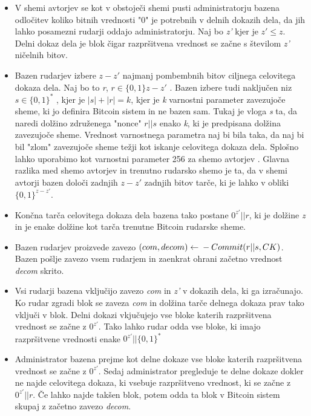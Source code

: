 \documentclass{acm_proc_article-sp}
\begin{document}
\begin{itemize}
	\item V shemi avtorjev se kot v obstoječi shemi pusti administratorju bazena odločitev koliko bitnih vrednosti "0" je potrebnih v delnih dokazih dela, da jih lahko posamezni rudarji oddajo administratorju. Naj bo \textit{z'} kjer je \textit{$z' \le z$}. Delni dokaz dela je blok čigar razpršitvena vrednost se začne s številom \textit{z'} ničelnih bitov.
	\item Bazen rudarjev izbere \textit{$z - z'$} najmanj pombembnih bitov ciljnega celovitega dokaza dela. Naj bo to \textit{r}, $r \in \{0, 1\} z - z'$ . Bazen izbere tudi naključen niz $s \in \{0, 1\}^*$ , kjer je \textit{$ |s| + |r| = k$}, kjer je \textit{k} varnostni parameter zavezujoče sheme, ki jo definira Bitcoin sistem in ne bazen sam. Tukaj je vloga \textit{s} ta, da naredi dolžino združenega "nonce" \textit{$r||s$} enako \textit{k}, ki je predpisana dolžina zavezujoče sheme. Vrednost varnostnega parametra naj bi bila taka, da naj bi bil "zlom" zavezujoče sheme težji kot iskanje celovitega dokaza dela. Splošno lahko uporabimo kot varnostni parameter 256 za shemo avtorjev \cite{originalarticle}. Glavna razlika med shemo avtorjev in trenutno rudarsko shemo je ta, da v shemi avtorji bazen določi zadnjih \textit{$ z - z' $} zadnjih bitov tarče, ki je lahko v obliki $\{0, 1\}^{z-z'}$.
	\item Končna tarča celovitega dokaza dela bazena tako postane \textit{$0^{z'}||r$}, ki je dolžine \textit{z} in je enake dolžine kot tarča trenutne Bitcoin rudarske sheme.
	\item Bazen rudarjev proizvede zavezo \textit{$(com, decom) \leftarrow \\ - Commit(r||s, CK)$}. Bazen pošlje zavezo vsem rudarjem in zaenkrat ohrani začetno vrednost \textit{decom} skrito.
	\item  Vsi rudarji bazena vključijo zavezo \textit{com} in \textit{z'} v dokazih dela, ki ga izračunajo. Ko rudar zgradi blok se zaveza \textit{com} in dolžina tarče delnega dokaza prav tako vključi v blok. Delni dokazi vkjučujejo vse bloke katerih razpršitvena vrednost se začne z $0^{z'}$. Tako lahko rudar odda vse bloke, ki imajo razpršitvene vrednosti enake $0^{z'}||\{0, 1\}^*$
	\item Administrator bazena prejme kot delne dokaze vse bloke katerih razpršitvena vrednost se začne z $0^{z'}$. Sedaj administrator pregleduje te delne dokaze dokler ne najde celovitega dokaza, ki vsebuje razpršitveno vrednost, ki se začne z $0^{z'}||r$. Če lahko najde takšen blok, potem odda ta blok v Bitcoin sistem skupaj z začetno zavezo \textit{decom}. 

\end{itemize}
\end{document}
